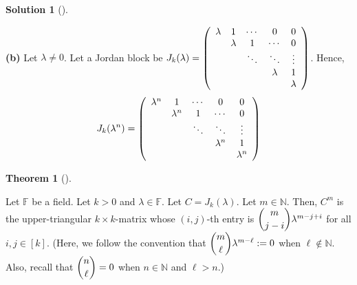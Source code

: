 \documentclass[numbers=enddot,12pt,final,onecolumn,notitlepage]{scrartcl}
\newcounter{sol}
\theoremstyle{definition}
\newtheorem{theo}{Theorem}[subsection]
\newenvironment{theorem}[1][]
{\begin{theo}[#1]\begin{leftbar}}
        {\end{leftbar}\end{theo}}
\newtheorem{solu}[sol]{Solution}
\newenvironment{solution}[1][]
{\begin{solu}[#1]\begin{leftbar}}
        {\end{leftbar}\end{solu}}
\begin{document}
\begin{solution}
	\textbf{(b)} Let $\lambda \neq 0$. Let a Jordan block be $J_k(\lambda) =
		\left(
		\begin{array}[c]{ccccc}
				\lambda  & 1        & \cdots   & 0        & 0       \\
				\text{ } & \lambda  & 1        & \cdots   & 0       \\
				\text{ } & \text{ } & \ddots   & \ddots   & \vdots  \\
				\text{ } & \text{ } & \text{ } & \lambda  & 1       \\
				\text{ } & \text{ } & \text{ } & \text{ } & \lambda
			\end{array}
		\right)$. Hence,
	\[
		J_k(\lambda^n) =
		\left(
		\begin{array}[c]{ccccc}
				\lambda^n & 1         & \cdots   & 0         & 0         \\
				\text{ }  & \lambda^n & 1        & \cdots    & 0         \\
				\text{ }  & \text{ }  & \ddots   & \ddots    & \vdots    \\
				\text{ }  & \text{ }  & \text{ } & \lambda^n & 1         \\
				\text{ }  & \text{ }  & \text{ } & \text{ }  & \lambda^n
			\end{array}
		\right)
	\]

	\begin{theorem}
		\label{thm.jnf.powers.Cm}Let $\mathbb{F}$ be a field. Let $k>0$ and
		$\lambda\in\mathbb{F}$. Let $C=J_{k}\left(  \lambda\right)  $. Let
		$m\in\mathbb{N}$. Then, $C^{m}$ is the upper-triangular $k\times k$-matrix
		whose $\left(  i,j\right)  $-th entry is $\dbinom{m}{j-i}\lambda^{m-j+i}$ for
		all $i,j\in\left[  k\right]  $. (Here, we follow the convention that
		$\dbinom{m}{\ell}\lambda^{m-\ell}:=0$ when $\ell\notin\mathbb{N}$. Also,
		recall that $\dbinom{n}{\ell}=0$ when $n\in\mathbb{N}$ and $\ell>n$.)
	\end{theorem}


\end{solution}
\end{document}
